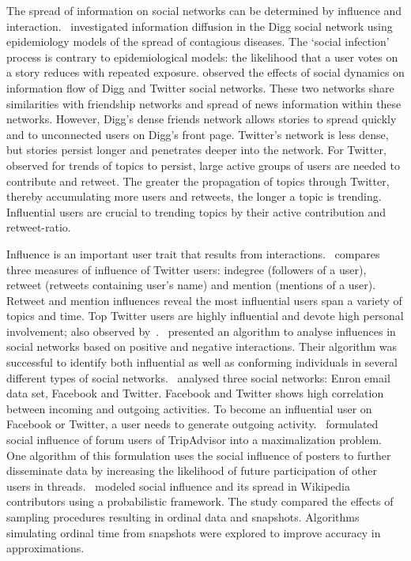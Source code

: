 The spread of information on social networks can be determined by influence and interaction.~\cite{ver2011stops} investigated information diffusion in the Digg social network using epidemiology models of the spread of contagious diseases. The `social infection’ process is contrary to epidemiological models: the likelihood that a user votes on a story reduces with repeated exposure.\cite{lerman2010information} observed the effects of social dynamics on information flow of Digg and Twitter social networks. These two networks share similarities with friendship networks and spread of news information within these networks. However, Digg’s dense friends network allows stories to spread quickly and to unconnected users on Digg’s front page. Twitter’s network is less dense, but stories persist longer and penetrates deeper into the network. For Twitter,~\cite{asur2011trends} observed for trends of topics to persist, large active groups of users are needed to contribute and retweet. The greater the propagation of topics through Twitter, thereby accumulating more users and retweets, the longer a topic is trending. Influential users are crucial to trending topics by their active contribution and retweet-ratio.


Influence is an important user trait that results from interactions.~\cite{cha2010measuring} compares three measures of influence of Twitter users: indegree (followers of a user), retweet (retweets containing user’s name) and mention (mentions of a user). Retweet and mention influences reveal the most influential users span a variety of topics and time. Top Twitter users are highly influential and devote high personal involvement; also observed by~\cite{asur2011trends}.~\cite{li2011casino} presented an algorithm to analyse influences in social networks based on positive and negative interactions. Their algorithm was successful to identify both influential as well as conforming individuals in several different types of social networks.~\cite{saez2011high} analysed three social networks: Enron email data set, Facebook and Twitter. Facebook and Twitter shows high correlation between incoming and outgoing activities. To become an influential user on Facebook or Twitter, a user needs to generate outgoing activity.~\cite{sun2011participation} formulated social influence of forum users of TripAdvisor into a maximalization problem. One algorithm of this formulation uses the social influence of posters to further disseminate data by increasing the likelihood of future participation of other users in threads.~\cite{cosley2010sequential} modeled social influence and its spread in Wikipedia contributors using a probabilistic framework. The study compared the effects of sampling procedures resulting in ordinal data and snapshots. Algorithms simulating ordinal time from snapshots were explored to improve accuracy in approximations.


